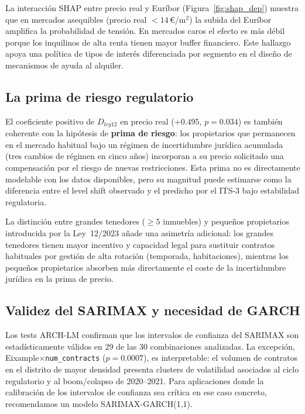 \documentclass[10pt,a4paper,twocolumn]{article}
\begin{document}
La interacción SHAP entre precio real y Euríbor (Figura~\ref{fig:shap_dep}) muestra
que en mercados asequibles (precio real $< 14$\,\euro/m$^2$) la subida del Euríbor
amplifica la probabilidad de tensión. En mercados caros el efecto es más débil porque
los inquilinos de alta renta tienen mayor buffer financiero. Este hallazgo apoya una
política de tipos de interés diferenciada por segmento en el diseño de mecanismos de
ayuda al alquiler.

\subsection{La prima de riesgo regulatorio}

El coeficiente positivo de $D_{ley12}$ en precio real ($+0.495$, $p{=}0.034$) es
también coherente con la hipótesis de \textbf{prima de riesgo}: los propietarios que
permanecen en el mercado habitual bajo un régimen de incertidumbre jurídica acumulada
(tres cambios de régimen en cinco años) incorporan a su precio solicitado una
compensación por el riesgo de nuevas restricciones. Esta prima no es directamente
modelable con los datos disponibles, pero su magnitud puede estimarse como la
diferencia entre el level shift observado y el predicho por el ITS-3 bajo estabilidad
regulatoria.

La distinción entre grandes tenedores ($\geq 5$ inmuebles) y pequeños propietarios
introducida por la Ley~12/2023 añade una asimetría adicional: los grandes tenedores
tienen mayor incentivo y capacidad legal para sustituir contratos habituales por
gestión de alta rotación (temporada, habitaciones), mientras los pequeños propietarios
absorben más directamente el coste de la incertidumbre jurídica en la prima de precio.

\subsection{Validez del SARIMAX y necesidad de GARCH}

Los tests ARCH-LM confirman que los intervalos de confianza del SARIMAX son
estadísticamente válidos en 29 de las 30 combinaciones analizadas. La excepción,
Eixample$\times$\texttt{num\_contracts} ($p{=}0.0007$), es interpretable: el volumen
de contratos en el distrito de mayor densidad presenta clusters de volatilidad
asociados al ciclo regulatorio y al boom/colapso de 2020--2021. Para aplicaciones
donde la calibración de los intervalos de confianza sea crítica en ese caso concreto,
recomendamos un modelo SARIMAX-GARCH(1,1).
\end{document}
